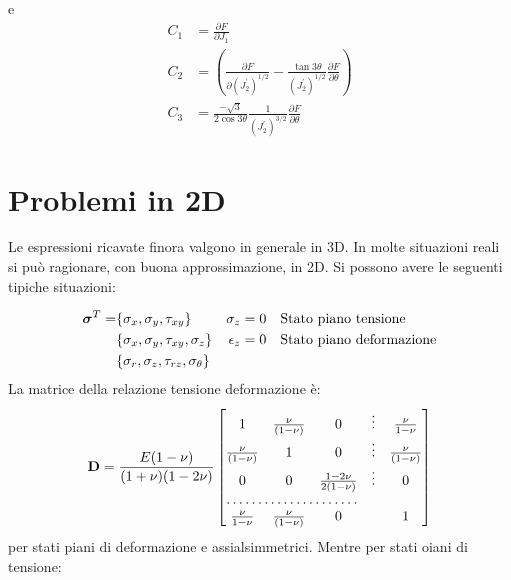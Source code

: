 e
\begin{equation}
 	\begin{split}
 		C_1 & = \frac{\partial F}{\partial J_1} \\
 		C_2 & = (\frac{\partial F}{\partial (J_2^{'})^{1/2}} - \frac{\tan 3 \theta}{(J_2^{'})^{1/2}} \frac{\partial F}{\partial \theta})	\\
 		C_3 & = \frac{- \sqrt{3}}{2 \cos 3 \theta} \frac{1}{(J_2^{'})^{3/2}} \frac{\partial F}{\partial \theta}
 	\end{split}
\end{equation}

\section{Problemi in 2D}
Le espressioni ricavate finora valgono in generale in 3D. In molte situazioni reali si può ragionare, con buona approssimazione, in 2D. Si possono avere le seguenti tipiche situazioni:

\begin{align}
	\boldsymbol{\sigma}^T = & \{ \sigma_x, \sigma_y, \tau_{xy}   \}           		& \sigma_z = 0   	& \quad \text{Stato piano tensione}		\notag \\
                            & \{ \sigma_x, \sigma_y, \tau_{xy}, \sigma_z  \}  		& \epsilon_z = 0 	& \quad \text{Stato piano deformazione}	\notag \\
                            & \{ \sigma_r, \sigma_z, \tau_{rz}, \sigma_{\theta}  \} &					&										\notag \\
\end{align}
La matrice della relazione tensione deformazione è:
\begin{equation}
	\mathbf{D} = \frac{E(1- \nu)}{(1 + \nu)(1-2\nu)}
	\begin{bmatrix}
		1                      	& \frac{\nu}{(1 - \nu)}	& 0 							& \vdots & \frac{\nu}{1 - \nu}  	\\
		\frac{\nu}{(1 - \nu)}  	& 1                    	& 0 							& \vdots & \frac{\nu}{(1 - \nu)}	\\
		0					   	& 0						& \frac{1 - 2 \nu}{2(1-\nu)} 	& \vdots & 0						\\
		\hdotsfor{3} \\
		\frac{\nu}{1 - \nu}		& \frac{\nu}{(1 - \nu)}	& 0								&        & 1
	\end{bmatrix}
\end{equation}
per stati piani di deformazione e assialsimmetrici. Mentre per stati oiani di tensione:

